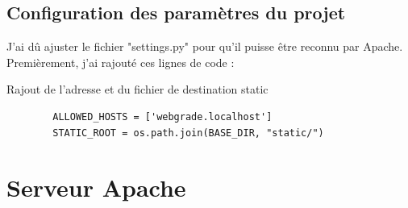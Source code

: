 \documentclass[12pt, a4paper]{article}
\begin{document}
    \subsection{Configuration des paramètres du projet}
    J'ai dû ajuster le fichier "settings.py" pour qu'il puisse être reconnu
    par Apache. 
    Premièrement, j'ai rajouté ces lignes de code :
    \begin{listing}[H]
        \caption{Rajout de l'adresse et du fichier de destination static}
        \label{lst:settings}
        \begin{verbatim}
        ALLOWED_HOSTS = ['webgrade.localhost']
        STATIC_ROOT = os.path.join(BASE_DIR, "static/")
        \end{verbatim}
    \end{listing}
    \newpage
\section{Serveur Apache}
\end{document}
